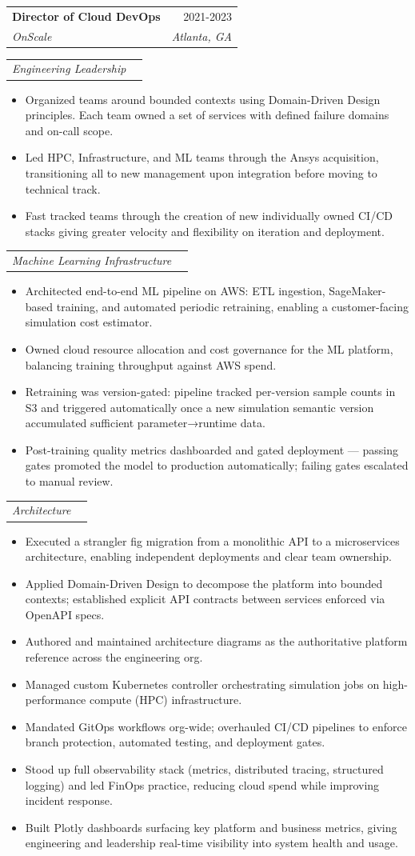 \documentclass[letterpaper,11pt]{article}
\makeatletter
\newcommand{\resumeItem}[1]{
  \item\small{
    {#1 \vspace{-2pt}}
  }
}
\newcommand{\resumeSubheading}[4]{
  \vspace{-2pt}\item
    \begin{tabular*}{0.97\textwidth}[t]{l@{\extracolsep{\fill}}r}
      \textbf{#1} & #2 \\
      \textit{\small#3} & \textit{\small #4} \\
    \end{tabular*}\vspace{-7pt}
}
\newcommand{\resumeSubSubheading}[2]{
    \item
    \begin{tabular*}{0.97\textwidth}{l@{\extracolsep{\fill}}r}
      \textit{\small#1} & \textit{\small #2} \\
    \end{tabular*}\vspace{-7pt}
}
\newcommand{\resumeItemListStart}{\begin{itemize}}
\newcommand{\resumeItemListEnd}{\end{itemize}\vspace{-5pt}}
\makeatother
\begin{document}
    \resumeSubheading
      {Director of Cloud DevOps}{2021-2023}
      {OnScale}{Atlanta, GA}
      \resumeSubSubheading
      {Engineering Leadership}{}
      \resumeItemListStart
        \resumeItem{Organized teams around bounded contexts using Domain-Driven Design principles. Each team owned a set of services with defined failure domains and on-call scope.}
        \resumeItem{Led HPC, Infrastructure, and ML teams through the Ansys acquisition, transitioning all to new management upon integration before moving to technical track.}
        \resumeItem{Fast tracked teams through the creation of new individually owned CI/CD stacks giving greater velocity and flexibility on iteration and deployment.}
      \resumeItemListEnd
      \resumeSubSubheading
      {Machine Learning Infrastructure}{}
      \resumeItemListStart
        \resumeItem{Architected end-to-end ML pipeline on AWS: ETL ingestion, SageMaker-based training, and automated periodic retraining, enabling a customer-facing simulation cost estimator.}
        \resumeItem{Owned cloud resource allocation and cost governance for the ML platform, balancing training throughput against AWS spend.}
        \resumeItem{Retraining was version-gated: pipeline tracked per-version sample counts in S3 and triggered automatically once a new simulation semantic version accumulated sufficient parameter→runtime data.}
        \resumeItem{Post-training quality metrics dashboarded and gated deployment --- passing gates promoted the model to production automatically; failing gates escalated to manual review.}
      \resumeItemListEnd
      \resumeSubSubheading
      {Architecture}{}
      \resumeItemListStart
        \resumeItem{Executed a strangler fig migration from a monolithic API to a microservices architecture, enabling independent deployments and clear team ownership.}
        \resumeItem{Applied Domain-Driven Design to decompose the platform into bounded contexts; established explicit API contracts between services enforced via OpenAPI specs.}
        \resumeItem{Authored and maintained architecture diagrams as the authoritative platform reference across the engineering org.}
        \resumeItem{Managed custom Kubernetes controller orchestrating simulation jobs on high-performance compute (HPC) infrastructure.}
        \resumeItem{Mandated GitOps workflows org-wide; overhauled CI/CD pipelines to enforce branch protection, automated testing, and deployment gates.}
        \resumeItem{Stood up full observability stack (metrics, distributed tracing, structured logging) and led FinOps practice, reducing cloud spend while improving incident response.}
        \resumeItem{Built Plotly dashboards surfacing key platform and business metrics, giving engineering and leadership real-time visibility into system health and usage.}
      \resumeItemListEnd
\end{document}
